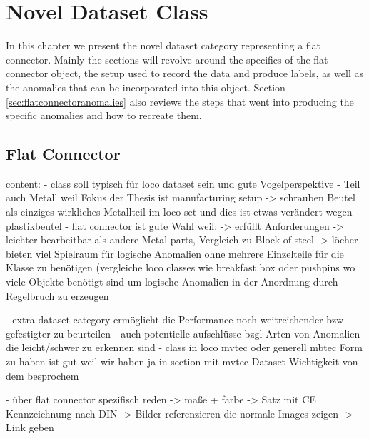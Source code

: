 \chapter{Novel Dataset Class}
\label{chap:datasets}

In this chapter we present the novel dataset category representing a flat connector. Mainly the sections will revolve around the specifics of the flat connector object, the setup used to 
record the data and produce labels, as well as the anomalies that can be incorporated into this object. Section \ref{sec:flatconnectoranomalies} also reviews the steps that went into producing the specific anomalies 
and how to recreate them.


\section{Flat Connector}
\label{sec:faltconnectordesscription}

content:
- class soll typisch für loco dataset sein und gute Vogelperspektive 
- Teil auch Metall weil Fokus der Thesis ist manufacturing setup
-> schrauben Beutel als einziges wirkliches Metallteil im loco set und dies ist etwas verändert wegen plastikbeutel
- flat connector ist gute Wahl weil:
-> erfüllt Anforderungen
-> leichter bearbeitbar als andere Metal parts, Vergleich zu Block of steel
-> löcher bieten viel Spielraum für logische Anomalien ohne mehrere Einzelteile für die Klasse zu benötigen (vergleiche loco classes wie breakfast box oder pushpins wo viele Objekte benötigt sind um logische Anomalien in der Anordnung durch Regelbruch zu erzeugen


- extra dataset category ermöglicht die Performance noch weitreichender bzw gefestigter zu beurteilen
- auch potentielle aufschlüsse bzgl Arten von Anomalien die leicht/schwer zu erkennen sind
- class in loco mvtec oder generell mbtec Form zu haben ist gut weil wir haben ja in section mit mvtec Dataset Wichtigkeit von dem besprochem

- über flat connector spezifisch reden
 -> maße + farbe
-> Satz mit CE Kennzeichnung nach DIN
-> Bilder referenzieren die normale Images zeigen 
-> Link geben



